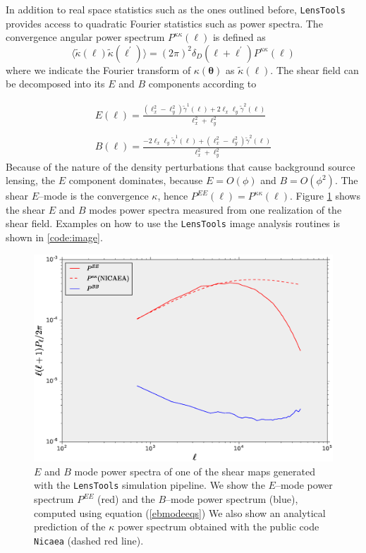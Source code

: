 \documentclass[5p]{elsarticle}
\newcommand{\ttt}[1]{\texttt{#1}}
\newcommand{\LT}{\texttt{LensTools} }
\begin{document}
%
In addition to real space statistics such as the ones outlined before, \LT provides access to quadratic Fourier statistics such as power spectra. The convergence angular power spectrum $P^{\kappa\kappa}(\ell)$ is defined as  
\begin{equation}
\label{kappapsdefinition}
\langle\tilde{\kappa}(\pmb{\ell})\tilde{\kappa}(\pmb{\ell}^\prime)\rangle = (2\pi)^2\delta_D(\pmb{\ell}+\pmb{\ell}^\prime)P^{\kappa\kappa}(\ell)
\end{equation}
%
where we indicate the Fourier transform of $\kappa(\pmb{\theta})$ as $\tilde{\kappa}(\pmb{\ell})$. The shear field can be decomposed into its $E$ and $B$ components according to 

\begin{equation}
\label{ebmodeeqs}
\begin{matrix}
E(\pmb{\ell}) = \frac{(\ell_x^2-\ell_y^2)\tilde{\gamma}^1(\pmb{\ell})+2\ell_x\ell_y\tilde{\gamma}^2(\pmb{\ell})}{\ell_x^2+\ell_y^2}  \\ \\
B(\pmb{\ell}) = \frac{-2\ell_x\ell_y\tilde{\gamma}^1(\pmb{\ell})+(\ell_x^2-\ell_y^2)\tilde{\gamma}^2(\pmb{\ell})}{\ell_x^2+\ell_y^2}
\end{matrix}
\end{equation}
%
Because of the nature of the density perturbations that cause background source lensing, the $E$ component dominates, because $E=O(\phi)$ and $B=O(\phi^2)$. The shear $E$--mode is the convergence $\kappa$, hence $P^{EE}(\ell)=P^{\kappa\kappa}(\ell)$. Figure \ref{ebmodefig} shows the shear $E$ and $B$ modes power spectra measured from one realization of the shear field. Examples on how to use the \LT image analysis routines is shown in \ref{code:image}.   

\begin{figure}
\includegraphics[scale=0.3]{Figures/eb_modes.eps}
\caption{$E$ and $B$ mode power spectra of one of the shear maps generated with the \LT simulation pipeline. We show the $E$--mode power spectrum $P^{EE}$ (red) and the $B$--mode power spectrum (blue), computed using equation (\ref{ebmodeeqs}) We also show an analytical prediction of the $\kappa$ power spectrum obtained with the public code \ttt{Nicaea} (dashed red line).}
\label{ebmodefig}
\end{figure}
\end{document}
